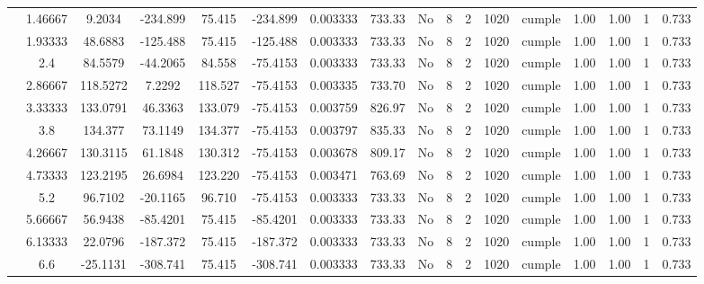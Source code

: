 \begin{table}[H]
{\begin{tabular}{|c|c|c|c|c|c|c|c|c|c|c|c|c|c|c|c|c|}
\cline{2-17}    & 1.46667 & 9.2034 & -234.899 & 75.415 & -234.899 & 0.003333 & 733.33 & No  & 8   & 2   & 1020 & \cellcolor[rgb]{ .776,  .937,  .808}cumple & 1.00 & 1.00 & 1   & 0.733 \bigstrut\\
\cline{2-17}    & 1.93333 & 48.6883 & -125.488 & 75.415 & -125.488 & 0.003333 & 733.33 & No  & 8   & 2   & 1020 & \cellcolor[rgb]{ .776,  .937,  .808}cumple & 1.00 & 1.00 & 1   & 0.733 \bigstrut\\
\cline{2-17}    & 2.4 & 84.5579 & -44.2065 & 84.558 & -75.4153 & 0.003333 & 733.33 & No  & 8   & 2   & 1020 & \cellcolor[rgb]{ .776,  .937,  .808}cumple & 1.00 & 1.00 & 1   & 0.733 \bigstrut\\
\cline{2-17}    & 2.86667 & 118.5272 & 7.2292 & 118.527 & -75.4153 & 0.003335 & 733.70 & No  & 8   & 2   & 1020 & \cellcolor[rgb]{ .776,  .937,  .808}cumple & 1.00 & 1.00 & 1   & 0.733 \bigstrut\\
\cline{2-17}    & 3.33333 & 133.0791 & 46.3363 & 133.079 & -75.4153 & 0.003759 & 826.97 & No  & 8   & 2   & 1020 & \cellcolor[rgb]{ .776,  .937,  .808}cumple & 1.00 & 1.00 & 1   & 0.733 \bigstrut\\
\cline{2-17}    & 3.8 & 134.377 & 73.1149 & 134.377 & -75.4153 & 0.003797 & 835.33 & No  & 8   & 2   & 1020 & \cellcolor[rgb]{ .776,  .937,  .808}cumple & 1.00 & 1.00 & 1   & 0.733 \bigstrut\\
\cline{2-17}    & 4.26667 & 130.3115 & 61.1848 & 130.312 & -75.4153 & 0.003678 & 809.17 & No  & 8   & 2   & 1020 & \cellcolor[rgb]{ .776,  .937,  .808}cumple & 1.00 & 1.00 & 1   & 0.733 \bigstrut\\
\cline{2-17}    & 4.73333 & 123.2195 & 26.6984 & 123.220 & -75.4153 & 0.003471 & 763.69 & No  & 8   & 2   & 1020 & \cellcolor[rgb]{ .776,  .937,  .808}cumple & 1.00 & 1.00 & 1   & 0.733 \bigstrut\\
\cline{2-17}    & 5.2 & 96.7102 & -20.1165 & 96.710 & -75.4153 & 0.003333 & 733.33 & No  & 8   & 2   & 1020 & \cellcolor[rgb]{ .776,  .937,  .808}cumple & 1.00 & 1.00 & 1   & 0.733 \bigstrut\\
\cline{2-17}    & 5.66667 & 56.9438 & -85.4201 & 75.415 & -85.4201 & 0.003333 & 733.33 & No  & 8   & 2   & 1020 & \cellcolor[rgb]{ .776,  .937,  .808}cumple & 1.00 & 1.00 & 1   & 0.733 \bigstrut\\
\cline{2-17}    & 6.13333 & 22.0796 & -187.372 & 75.415 & -187.372 & 0.003333 & 733.33 & No  & 8   & 2   & 1020 & \cellcolor[rgb]{ .776,  .937,  .808}cumple & 1.00 & 1.00 & 1   & 0.733 \bigstrut\\
\cline{2-17}    & \cellcolor[rgb]{ .851,  .882,  .949}6.6 & -25.1131 & -308.741 & 75.415 & -308.741 & 0.003333 & 733.33 & No  & 8   & 2   & 1020 & \cellcolor[rgb]{ .776,  .937,  .808}cumple & 1.00 & 1.00 & 1   & 0.733 \bigstrut\\

\end{tabular}}
\end{table}
